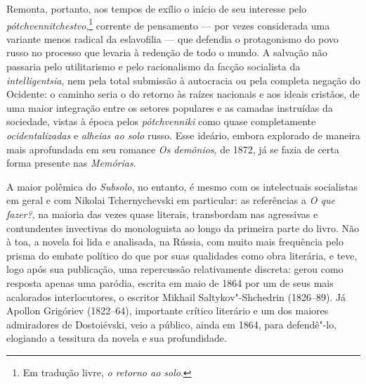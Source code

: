 Remonta, portanto, aos tempos de exílio o início de seu interesse pelo
\textit{pótchvennitchestvo},\footnote{Em tradução livre, \textit{o retorno ao solo}.}
corrente de pensamento --- por vezes considerada uma variante menos radical da
eslavofilia --- que defendia o protagonismo do povo russo no processo que levaria
à redenção de todo o mundo. A salvação não passaria pelo utilitarismo e pelo
racionalismo da facção socialista da \textit{intelligentsia}, nem pela total
submissão à autocracia ou pela completa negação do Ocidente: o caminho seria o
do retorno às raízes nacionais e aos ideais cristãos, de uma maior integração
entre os setores populares e as camadas instruídas da sociedade, vistas à época
pelos \textit{pótchvenniki} como quase completamente \textit{ocidentalizadas} e
\textit{alheias ao solo} russo. Esse ideário, embora explorado de maneira mais
aprofundada em seu romance \textit{Os demônios}, de 1872, já se fazia de certa
forma presente nas \textit{Memórias}.

A maior polêmica do \textit{Subsolo}, no entanto, é mesmo com os intelectuais
socialistas em geral e com Nikolai Tchernychevski em particular: as referências
a \textit{O que fazer?}, na maioria das vezes quase literais, transbordam nas
agressivas e contundentes invectivas do monologuista ao longo da primeira parte
do livro. Não à toa, a novela foi lida e analisada, na Rússia, com muito mais
frequência pelo prisma do embate político do que por suas qualidades como obra
literária, e teve, logo após sua publicação, uma repercussão relativamente
discreta: gerou como resposta apenas uma paródia, escrita em maio de 1864 por
um de seus mais acalorados interlocutores, o escritor Mikhail Saltykov"-Shchedrin
(1826--89). Já Apollon Grigóriev (1822--64), importante crítico literário e um
dos maiores admiradores de Dostoiévski, veio a público, ainda em 1864, para
defendê"-lo, elogiando a tessitura da novela e sua profundidade.

